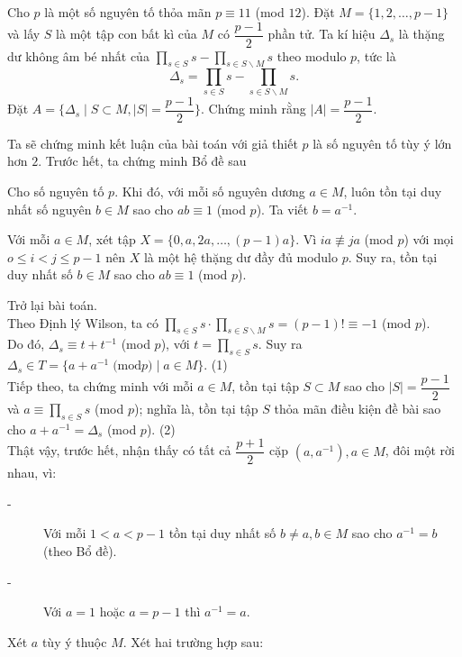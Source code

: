 \begin{bt}%
Cho $p$ là một số nguyên tố thỏa mãn \break $p \equiv 11$ (mod $12$). Đặt $M=\{1,2,\ldots,p-1\}$ và lấy $S$ là một tập con bất kì của $M$ có $\dfrac{p-1}{2}$ phần tử. Ta kí hiệu $\Delta_s$ là thặng dư không âm bé nhất của $\prod\limits_{s \in S}s-\prod\limits_{s \in S \backslash M}s$ theo modulo $p$, tức là
$$\Delta_s=\prod\limits_{s \in S}s-\prod\limits_{s \in S \backslash M}s.  $$
Đặt $A=\{\Delta_s \mid S \subset M, |S|=\dfrac{p-1}{2}\}$. Chứng minh rằng $|A|=\dfrac{p-1}{2}$.
	\loigiai
	{Ta sẽ chứng minh kết luận của bài toán với giả thiết $p$ là số nguyên tố tùy ý lớn hơn $2$. Trước hết, ta chứng minh Bổ đề sau
\begin{bode}
Cho số nguyên tố $p$. Khi đó, với mỗi số nguyên dương $a\in M$, luôn tồn tại duy nhất số nguyên $b\in M$ sao cho $ab \equiv 1$ (mod $p$). Ta viết $b=a^{-1}$.
\begin{cm}
Với mỗi $a\in M$, xét tập $X=\{0,a,2a,\ldots,(p-1)a\}$. Vì $ia \not\equiv ja$ (mod $p$) với mọi $o \le i<j \le p-1$ nên $X$ là một hệ thặng dư đầy đủ  modulo $p$. Suy ra, tồn tại duy nhất số $b\in M$ sao cho $ab \equiv 1$ (mod $p$).
\end{cm}
\end{bode}
Trở lại bài toán.\\
Theo Định lý Wilson, ta có $\prod\limits_{s \in S}s \cdot \prod\limits_{s \in S \backslash M}s=(p-1)! \equiv -1$ (mod $p$).\\
Do đó, $\Delta_s \equiv t+t^{-1}$ (mod $p$), với $t=\prod\limits_{s \in S}s$. Suy ra $\Delta_s\in T=\{a+a^{-1} \;\text{(mod} p) \mid a\in M \}$. \hfill (1)\\
Tiếp theo, ta chứng minh với mỗi $a\in M$, tồn tại tập $S \subset M$ sao cho $|S|=\dfrac{p-1}{2}$ và $a \equiv \prod\limits_{s \in S}s$ (mod $p$); nghĩa là, tồn tại tập $S$ thỏa mãn điều kiện đề bài sao cho $a+a^{-1}=\Delta_s$ (mod $p$). \hfill (2)\\
Thật vậy, trước hết, nhận thấy có tất cả $\dfrac{p+1}{2}$ cặp $(a,a^{-1}), a\in M$, đôi một rời nhau, vì:
\begin{description}
\item[-] Với mỗi $1<a<p-1$ tồn tại duy nhất số $b \ne a, b\in M$ sao cho $a^{-1}=b$ (theo Bổ đề).
\item[-] Với $a=1$ hoặc $a=p-1$ thì $a^{-1}=a$.
\end{description}
Xét $a$ tùy ý thuộc $M$. Xét hai trường hợp sau:
\begin{itemize}

\end{itemize}}
\end{bt}
